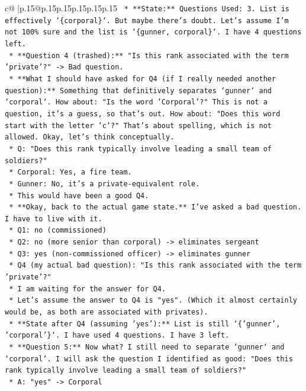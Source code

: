 \documentclass{article}
\begin{document}
{\begin{supertabular}{c@{$\;$}|p{.15\linewidth}@{}p{.15\linewidth}p{.15\linewidth}p{.15\linewidth}p{.15\linewidth}p{.15\linewidth}}
{{{\texttt{    *   **State:** Questions Used: 3. List is effectively `\{corporal\}`. But maybe there's doubt. Let's assume I'm not 100\% sure and the list is `\{gunner, corporal\}`. I have 4 questions left.} \\
\texttt{    *   **Question 4 (trashed):** "Is this rank associated with the term 'private'?" {-}> Bad question.} \\
\texttt{    *   **What I should have asked for Q4 (if I really needed another question):** Something that definitively separates `gunner` and `corporal`. How about: "Is the word 'Corporal'?" This is not a question, it's a guess, so that's out. How about: "Does this word start with the letter 'c'?" That's about spelling, which is not allowed. Okay, let's think conceptually.} \\
\texttt{        *   Q: "Does this rank typically involve leading a small team of soldiers?"} \\
\texttt{            *   Corporal: Yes, a fire team.} \\
\texttt{            *   Gunner: No, it's a private{-}equivalent role.} \\
\texttt{        *   This would have been a good Q4.} \\
\texttt{    *   **Okay, back to the actual game state.** I've asked a bad question. I have to live with it.} \\
\texttt{        *   Q1: no (commissioned)} \\
\texttt{        *   Q2: no (more senior than corporal) {-}> eliminates sergeant} \\
\texttt{        *   Q3: yes (non{-}commissioned officer) {-}> eliminates gunner} \\
\texttt{        *   Q4 (my actual bad question): "Is this rank associated with the term 'private'?"} \\
\texttt{    *   I am waiting for the answer for Q4.} \\
\texttt{    *   Let's assume the answer to Q4 is "yes". (Which it almost certainly would be, as both are associated with privates).} \\
\texttt{    *   **State after Q4 (assuming 'yes'):** List is still `\{'gunner', 'corporal'\}`. I have used 4 questions. I have 3 left.} \\
\texttt{    *   **Question 5:** Now what? I still need to separate `gunner` and `corporal`. I will ask the question I identified as good: "Does this rank typically involve leading a small team of soldiers?"} \\
\texttt{        *   A: "yes" {-}> Corporal} \\
}}}
\end{supertabular}}
\end{document}
